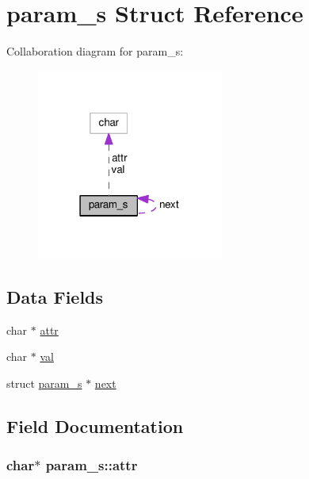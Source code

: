 \hypertarget{structparam__s}{}\section{param\+\_\+s Struct Reference}
\label{structparam__s}


Collaboration diagram for param\+\_\+s\+:
\nopagebreak
\begin{figure}[H]
\begin{center}
\leavevmode
\includegraphics[width=174pt]{structparam__s__coll__graph}
\end{center}
\end{figure}
\subsection*{Data Fields}
\begin{DoxyCompactItemize}
\item 
char $\ast$ \hyperlink{structparam__s_a8141d4841cdd1ff68e8d297adfd0bc7d}{attr}
\item 
char $\ast$ \hyperlink{structparam__s_a0a6dc944de0408390eeb1587625a0766}{val}
\item 
struct \hyperlink{structparam__s}{param\+\_\+s} $\ast$ \hyperlink{structparam__s_ae832fea9caff93e412f1bbdabf60e857}{next}
\end{DoxyCompactItemize}


\subsection{Field Documentation}
\subsubsection[{\texorpdfstring{attr}{attr}}]{\setlength{\rightskip}{0pt plus 5cm}char$\ast$ param\+\_\+s\+::attr}\hypertarget{structparam__s_a8141d4841cdd1ff68e8d297adfd0bc7d}{}\label{structparam__s_a8141d4841cdd1ff68e8d297adfd0bc7d}
